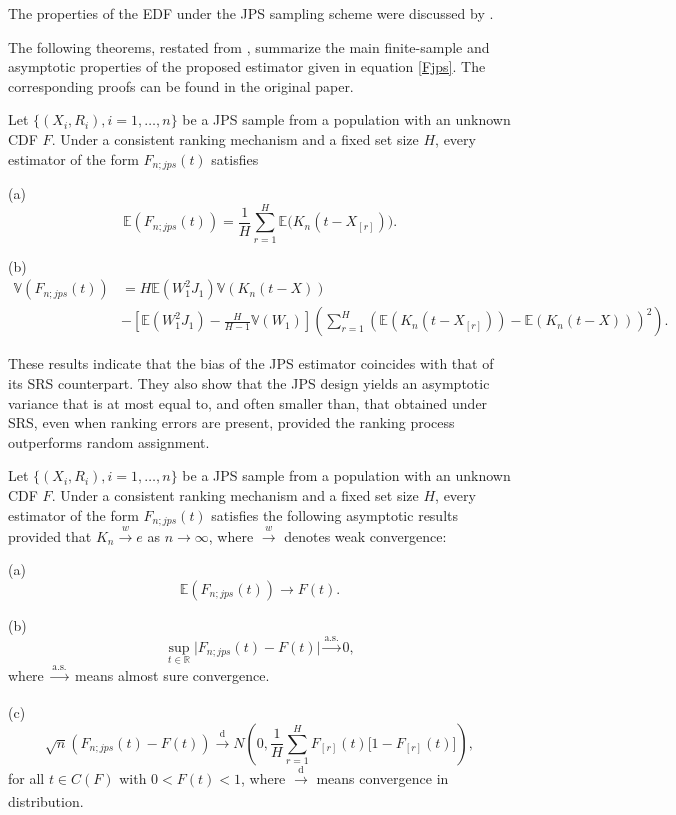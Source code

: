\documentclass[twoside]{article}
\begin{document}
The properties of the EDF under the JPS sampling scheme were discussed by \cite{dastbaravarde2016some}.

The following theorems,
 restated from \cite{kouhanestani2025statistical},
 summarize the main finite-sample and asymptotic properties of the proposed estimator given in equation \eqref{Fjps}. The corresponding proofs can be found in the original paper.

\begin{thm} \label{th1}
Let  $\{(X_i,R_i),  i={1},\dots, n\} $ be a JPS sample from a population with  an unknown CDF $F$. Under a consistent ranking mechanism and a fixed set size $H$, every estimator of the form $F_{n;jps}(t)$ satisfies

\noindent\textnormal{(a)} 
\[
\mathbb{E}(F_{n;jps}(t))
=
\frac{1}{H}\sum_{r=1}^{H}
\mathbb{E}\bigl(K_n(t-X_{[r]})\bigr).
\]

\noindent\textnormal{(b)} 
\begin{align*}
\mathbb {V}(F_{n;jps}(t))
&=
H \mathbb {E}(W_1^2 J_1)  \mathbb {V}\left(K_n(t-X)\right) \nonumber \\
&-\left[  \mathbb {E}(W_1^2 J_1)  - \frac{H}{H-1} \mathbb {V}(W_1)\right]\left(  \sum\limits_{r=1}^{H} {\left({\mathbb{E} \left(K_n(t-X_{[r]})\right) - \mathbb{E} \left(K_n(t-X)\right)}\right)}^2  \right).
\end{align*}
\end{thm}

These results indicate that the bias of the JPS estimator coincides with that of its SRS counterpart. They also show that the JPS design yields an asymptotic variance that is at most equal to, and often smaller than, that obtained under SRS, even when ranking errors are present, provided the ranking process outperforms random assignment.



\begin{thm} \label{th2}
Let $\{(X_i,R_i), i=1,\ldots,n\}$ be a JPS sample from a population with an unknown CDF $F$. Under a consistent ranking mechanism and a fixed set size $H$, every estimator of the form $F_{n;jps}(t)$  satisfies the following asymptotic results provided that
$
K_n \xrightarrow{w} e
$
as
$
n \to \infty
$,
where $\xrightarrow{w}$ denotes weak convergence:

\noindent\textnormal{(a)} 
\[
 \mathbb{E}(F_{n;jps}(t)) \xrightarrow[] {} F(t).
\]

\noindent\textnormal{(b)} 
$$\sup_{t \in\mathbb{R} }\big \lvert  F_{n;jps}(t) - F(t) \big \rvert \xrightarrow[]{\text{a.s.}} {0},$$
where $\xrightarrow[]{\text{a.s.}}$ means almost sure convergence.

\noindent\textnormal{(c)} 
$$\sqrt{n} \left( F_{n;jps}(t)-F(t)\right)\xrightarrow[]{\text{d}} N\left( {{0},\frac{{1}}{H}\sum\limits_{r = {1}}^H {{F_{[r]}}(t)[{1} - } {F_{[r]}}(t)]} \right),$$
 for all $t\in C(F)$ with $0<F(t)<1$, where $\xrightarrow[]{\text{d}}$ means convergence in distribution.
\end{thm}
\end{document}
